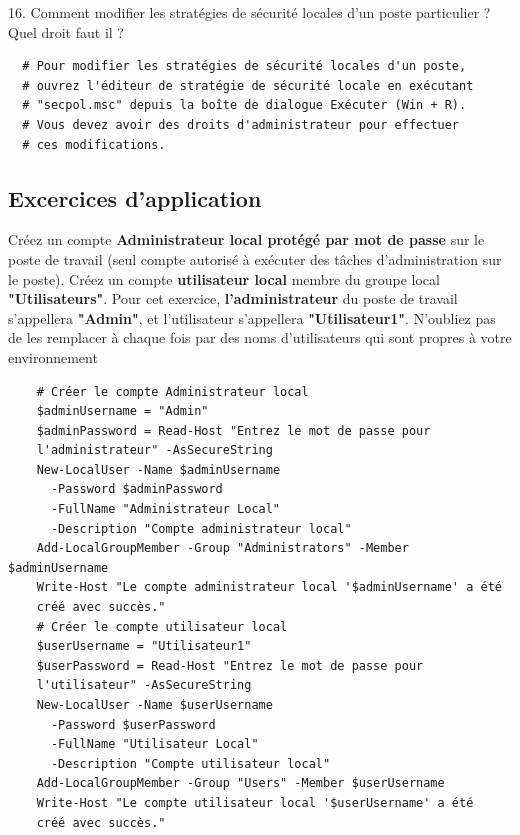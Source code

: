 16. Comment modifier les stratégies de sécurité locales d'un poste particulier ? Quel droit faut il ?

\begin{center}
  \begin{verbatim}
  # Pour modifier les stratégies de sécurité locales d'un poste,
  # ouvrez l'éditeur de stratégie de sécurité locale en exécutant
  # "secpol.msc" depuis la boîte de dialogue Exécuter (Win + R).
  # Vous devez avoir des droits d'administrateur pour effectuer
  # ces modifications.
  \end{verbatim}
\end{center}

\subsection*{Excercices d'application}
{}
\noindent Créez un compte \textbf{Administrateur local protégé par mot de passe} sur le poste de travail (seul compte
autorisé à exécuter des tâches d’administration sur le poste).
Créez un compte \textbf{utilisateur local} membre du groupe local \textbf{"Utilisateurs"}.
Pour cet exercice, \textbf{l’administrateur} du poste de travail s’appellera \textbf{"Admin"}, et l’utilisateur s’appellera
\textbf{"Utilisateur1"}. N’oubliez pas de les remplacer à chaque fois par des noms d’utilisateurs qui sont propres
à votre environnement

\begin{center}
  \begin{verbatim}
    # Créer le compte Administrateur local
    $adminUsername = "Admin"
    $adminPassword = Read-Host "Entrez le mot de passe pour
    l'administrateur" -AsSecureString
    New-LocalUser -Name $adminUsername 
      -Password $adminPassword 
      -FullName "Administrateur Local" 
      -Description "Compte administrateur local"
    Add-LocalGroupMember -Group "Administrators" -Member $adminUsername
    Write-Host "Le compte administrateur local '$adminUsername' a été
    créé avec succès."
    # Créer le compte utilisateur local
    $userUsername = "Utilisateur1"
    $userPassword = Read-Host "Entrez le mot de passe pour
    l'utilisateur" -AsSecureString
    New-LocalUser -Name $userUsername 
      -Password $userPassword 
      -FullName "Utilisateur Local" 
      -Description "Compte utilisateur local"
    Add-LocalGroupMember -Group "Users" -Member $userUsername
    Write-Host "Le compte utilisateur local '$userUsername' a été
    créé avec succès."
  \end{verbatim}
\end{center}

